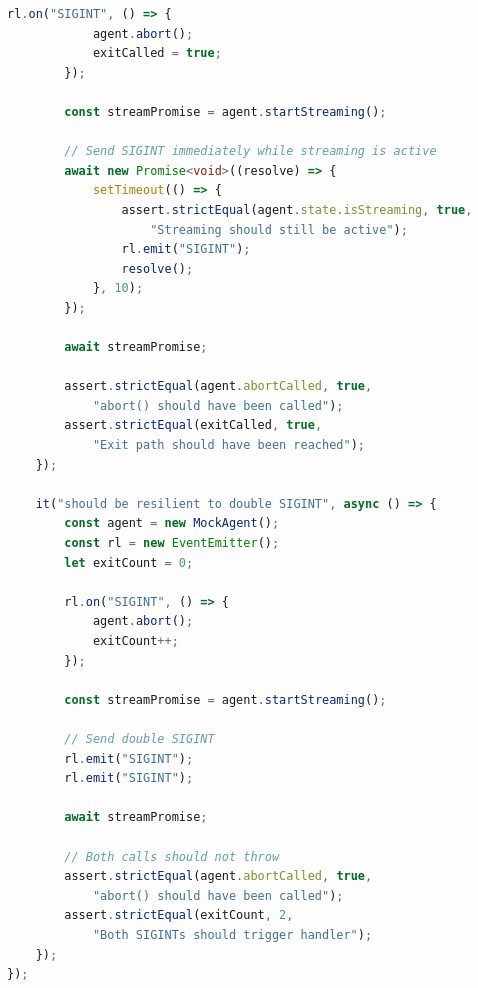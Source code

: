 \begin{lstlisting}[language=TypeScript]
        rl.on("SIGINT", () => {
            agent.abort();
            exitCalled = true;
        });

        const streamPromise = agent.startStreaming();

        // Send SIGINT immediately while streaming is active
        await new Promise<void>((resolve) => {
            setTimeout(() => {
                assert.strictEqual(agent.state.isStreaming, true,
                    "Streaming should still be active");
                rl.emit("SIGINT");
                resolve();
            }, 10);
        });

        await streamPromise;

        assert.strictEqual(agent.abortCalled, true,
            "abort() should have been called");
        assert.strictEqual(exitCalled, true,
            "Exit path should have been reached");
    });

    it("should be resilient to double SIGINT", async () => {
        const agent = new MockAgent();
        const rl = new EventEmitter();
        let exitCount = 0;

        rl.on("SIGINT", () => {
            agent.abort();
            exitCount++;
        });

        const streamPromise = agent.startStreaming();

        // Send double SIGINT
        rl.emit("SIGINT");
        rl.emit("SIGINT");

        await streamPromise;

        // Both calls should not throw
        assert.strictEqual(agent.abortCalled, true,
            "abort() should have been called");
        assert.strictEqual(exitCount, 2,
            "Both SIGINTs should trigger handler");
    });
});

\end{lstlisting}

